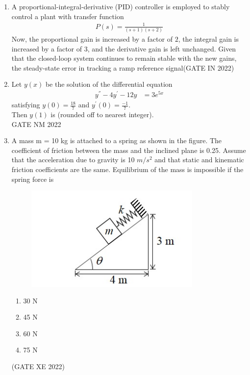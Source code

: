 \begin{enumerate}[label=\thechapter.\arabic*,ref=\thechapter.\theenumi]
\item A proportional-integral-derivative (PID) controller is employed to stably control a
plant with transfer function
\begin{align}
    P(s) = \frac{1}{(s+1)(s+2)}
\end{align}
Now, the proportional gain is increased by a factor of $2$, the integral gain is
increased by a factor of $3$, and the derivative gain is left unchanged. Given that the closed-loop system continues to remain stable with the new gains, the steady-state
error in tracking a ramp reference signal\hfill(GATE IN 2022) \\
\solution

\newpage
\item  Let $y(x)$ be the solution of the differential equation 
\begin{align}
y^{''} - 4y^{'} -12y &= 3e^{5x} 
 \label{eq:ishitha.g22.nm.50.1.eq}
\end{align}
satisfying $y(0)=\frac{18}{7}$ and $y^{'}(0)=\frac{-1}{7}$. \\
Then $y(1)$ is \underline{\hspace{2.5cm}}  (rounded off to nearest integer).  \\    \hfill{GATE NM 2022 } \\
\solution

\newpage


\item A mass m = 10 kg is attached to a spring as shown in the figure. The coefficient
of friction between the mass and the inclined plane is 0.25. Assume that the
acceleration due to gravity is 10 $m/s^2$ and that static and kinematic friction
coefficients are the same. Equilibrium of the mass is impossible if the spring
force is
\begin{figure}[!ht]
\centering
\begin{center}
\includegraphics[width=\columnwidth]{2022/XE/80/figs/question.png}
\end{center}
\end{figure}
\begin{enumerate}
    \item 30 N
    \item 45 N
    \item 60 N
    \item 75 N
\end{enumerate}
\hfill(GATE XE 2022)
\solution


\end{enumerate}
